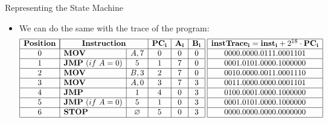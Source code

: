 \begin{frame}[allowframebreaks]{Representing the State Machine}
\begin{itemize}
\item We can do the same with the trace of the program:
\[
\begin{array}{|c|l|c|c|c|c|}
\hline
\mathbf{Position} & \multicolumn{2}{|c|}{\mathbf{Instruction}} & \mathbf{PC_i} & \mathbf{A_i} & \mathbf{B_i} \\ \hline
0 & \mathbf{MOV} & A, 7 & 0 & 0 & 0 \\ \hline
1 & \mathbf{JMP}~(if~A = 0) & 5 & 1 & 7 & 0 \\ \hline
2 & \mathbf{MOV} & B, 3 & 2 & 7 & 0 \\ \hline
3 & \mathbf{MOV} & A, 0 & 3 & 7 & 3 \\ \hline
4 & \mathbf{JMP} & 1 & 4 & 0 & 3 \\ \hline
5 & \mathbf{JMP}~(if~A = 0) & 5 & 1 & 0 & 3 \\ \hline
6 & \mathbf{STOP} & \emptyset & 5 & 0 & 3 \\ \hline
\end{array}
\hspace{0.1cm}
\begin{array}{|c|c|}
\hline
\mathbf{instTrace_i} = \mathbf{inst_i} + 2^{18} \cdot \mathbf{PC_i} \\ \hline
0000.0000.0111.0001101 \\ \hline
0001.0101.0000.1000000 \\ \hline
0010.0000.0011.0001110 \\ \hline
0011.0000.0000.0001101 \\ \hline
0100.0001.0000.1000000 \\ \hline
0001.0101.0000.1000000 \\ \hline
0000.0000.0000.0000000 \\ \hline
\end{array}
\]
\end{itemize}
\end{frame}












